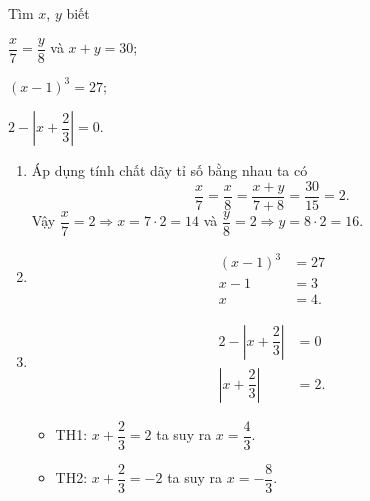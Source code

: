 		\begin{ex}%
			Tìm $x$, $y$ biết
			\begin{listEX}[3]
				\item $\dfrac{x}{7}=\dfrac{y}{8}$ và $x+y=30$;
				\item $(x-1)^3=27$;
				\item $2-\left|x+\dfrac{2}{3} \right|=0 $.
			\end{listEX}
			\loigiai
			{
				\begin{enumerate}
					\item
							Áp dụng tính chất dãy tỉ số bằng nhau ta có
							\[\dfrac{x}{7}=\dfrac{x}{8}=\dfrac{x+y}{7+8}=\dfrac{30}{15}=2.\]
							Vậy $\dfrac{x}{7}=2 \Rightarrow x=7\cdot 2=14$ và $\dfrac{y}{8}=2 \Rightarrow y=8\cdot 2=16$.
					\item 
						\begin{align*}
							(x-1)^3&=27\\
							x-1&=3\\
							x &= 4.
						\end{align*}
					\item 
						\begin{align*}
							2-\left|x+\dfrac{2}{3} \right|&=0\\
							\left|x+\dfrac{2}{3} \right|&=2.
						\end{align*}
						\begin{itemize}
							\item TH1: $x + \dfrac{2}{3} = 2$ ta suy ra $x = \dfrac{4}{3}$.
							\item TH2: $x + \dfrac{2}{3} = -2$ ta suy ra $x = -\dfrac{8}{3}$.
						\end{itemize}
				\end{enumerate}
			}
		\end{ex}
	
